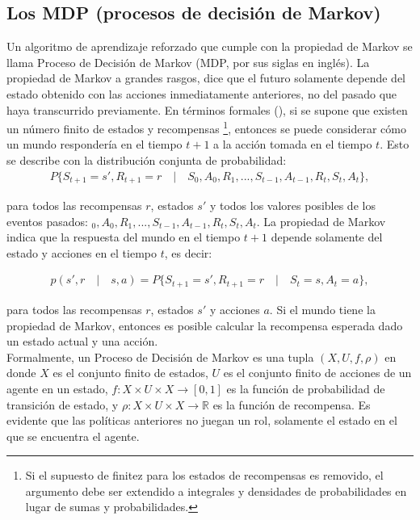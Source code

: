 \subsection{Los MDP (procesos de decisi\'on de Markov)}

Un algoritmo de aprendizaje reforzado que cumple con la propiedad de Markov se llama Proceso de Decisi\'on de Markov (MDP, por sus siglas en ingl\'es). La propiedad de Markov a grandes rasgos, dice que el futuro solamente depende del estado obtenido con las acciones inmediatamente anteriores, no del pasado que haya transcurrido previamente. En t\'erminos formales (\cite{Sutton}), si se supone que existen un n\'umero finito de estados y recompensas \footnote{Si el supuesto de finitez para los estados de recompensas es removido, el argumento debe ser extendido a integrales y densidades de probabilidades en lugar de sumas y probabilidades.}, entonces se puede considerar c\'omo un mundo responder\'ia en el tiempo $t+1$ a la acci\'on tomada en el tiempo $t$. Esto se describe con la distribuci\'on conjunta de probabilidad:\\

\vspace{-30pt}
\begin{align*}
P\{S_{t+1} = s', R_{t+1} = r \quad | \quad S_{0}, A_{0}, R_{1}, ... , S_{t-1}, A_{t-1}, R_{t}, S_{t}, A_{t} \},
\end{align*}

\noindent para todos las recompensas $r$, estados $s'$ y todos los valores posibles de los eventos pasados: $_{0}, A_{0}, R_{1}, ... , S_{t-1}, A_{t-1}, R_{t}, S_{t}, A_{t}$. La propiedad de Markov indica que la respuesta del mundo en el tiempo $t+1$ depende solamente del estado y acciones en el tiempo $t$, es decir:

\vspace{-30pt}
\begin{align*}
p\left(s', r \quad | \quad s,a \right) = P\{S_{t+1} = s', R_{t+1} = r \quad | \quad S_{t} = s, A_{t} =a\},
\end{align*}

\noindent para todos las recompensas $r$, estados $s'$ y acciones $a$. Si el mundo tiene la propiedad de Markov, entonces es posible calcular la recompensa esperada dado un estado actual y una acci\'on.\\

Formalmente, un Proceso de Decisi\'on de Markov es una tupla $(X,U,f,\rho)$ en donde $X$ es el conjunto finito de estados, $U$ es el conjunto finito de acciones de un agente en un estado, $f:X \times U \times X\rightarrow[0,1]$ es la funci\'on de probabilidad de transici\'on de estado, y $\rho:X \times U \times X\rightarrow\mathbb{R}$ es la funci\'on de recompensa. Es evidente que las pol\'iticas anteriores no juegan un rol, solamente el estado en el que se encuentra el agente.\\

